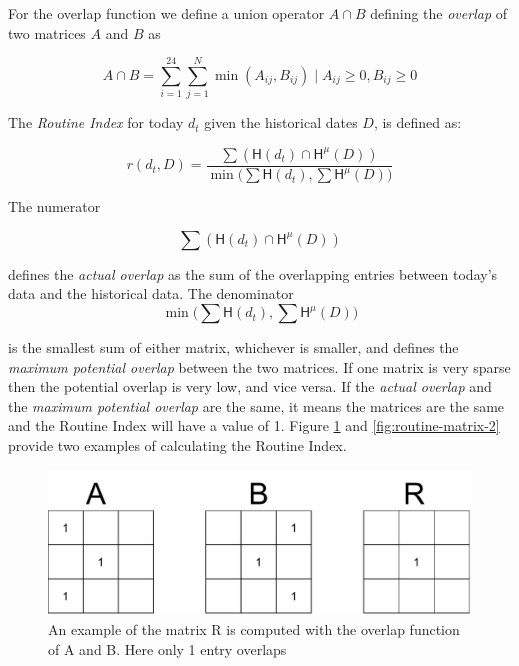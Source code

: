 For the overlap function we define a union operator $A \cap B$ defining the \textit{overlap} of two matrices $A$ and $B$ as 

\begin{equation}
\label{eq:overlap-function}
    A \cap B = \sum_{i=1}^{24} \sum_{j=1}^{N} \min (A_{ij}, B_{ij}) \;|\; A_{ij} \geq 0, B_{ij} \geq 0
\end{equation}

The \textit{Routine Index} for today $d_t$ given the historical dates $D$, is defined as: 

\begin{equation}
\label{eq:feature-routine-index}
r(d_t, D) = \frac{\sum (\mathsf{H}(d_t) \cap \mathsf{H}^{\mu} (D) )}{\min \Big(\sum \mathsf{H}(d_t), \sum \mathsf{H}^{\mu} (D) \Big)}
\end{equation}

The numerator 

\begin{equation}
\label{eq:feature-routine-index-numerator}
\sum (\mathsf{H}(d_t) \cap \mathsf{H}^{\mu} (D) )
\end{equation}

defines the \textit{actual overlap} as the sum of the overlapping entries between today's data and the historical data. The denominator 
\begin{equation}
\label{eq:feature-routine-index-denominator}
\min \Big(\sum \mathsf{H}(d_t), \sum \mathsf{H}^{\mu} (D) \Big)
\end{equation}

is the smallest sum of either matrix, whichever is smaller, and defines the \textit{maximum potential overlap} between the two matrices. If one matrix is very sparse then the potential overlap is very low, and vice versa. If the \textit{actual overlap} and the \textit{maximum potential overlap} are the same, it means the matrices are the same and the Routine Index will have a value of 1. Figure \ref{fig:routine-matrix-1} and \ref{fig:routine-matrix-2} provide two examples of calculating the Routine Index.

\begin{figure}[h]
    \centering
    \includegraphics[width=\textwidth]{images/routine-numbers-1.pdf}
    \caption{An example of the matrix R is computed with the overlap function of A and B. Here only 1 entry overlaps}
    \label{fig:routine-matrix-1}
\end{figure}

